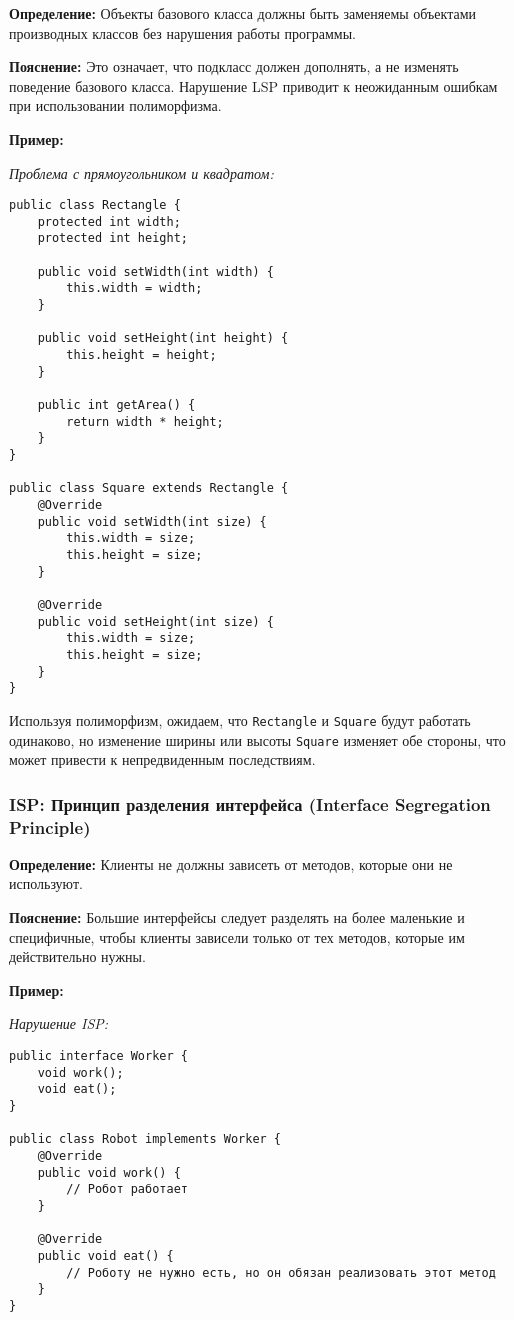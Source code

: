 \textbf{Определение:}
Объекты базового класса должны быть заменяемы объектами производных классов без нарушения работы программы.

\textbf{Пояснение:}
Это означает, что подкласс должен дополнять, а не изменять поведение базового класса. Нарушение LSP приводит к неожиданным ошибкам при использовании полиморфизма.

\textbf{Пример:}

\textit{Проблема с прямоугольником и квадратом:}
\begin{verbatim}
public class Rectangle {
    protected int width;
    protected int height;

    public void setWidth(int width) {
        this.width = width;
    }

    public void setHeight(int height) {
        this.height = height;
    }

    public int getArea() {
        return width * height;
    }
}

public class Square extends Rectangle {
    @Override
    public void setWidth(int size) {
        this.width = size;
        this.height = size;
    }

    @Override
    public void setHeight(int size) {
        this.width = size;
        this.height = size;
    }
}
\end{verbatim}

Используя полиморфизм, ожидаем, что \texttt{Rectangle} и \texttt{Square} будут работать одинаково, но изменение ширины или высоты \texttt{Square} изменяет обе стороны, что может привести к непредвиденным последствиям.

\subsubsection{ISP: Принцип разделения интерфейса (Interface Segregation Principle)}

\textbf{Определение:}
Клиенты не должны зависеть от методов, которые они не используют.

\textbf{Пояснение:}
Большие интерфейсы следует разделять на более маленькие и специфичные, чтобы клиенты зависели только от тех методов, которые им действительно нужны.

\textbf{Пример:}

\textit{Нарушение ISP:}
\begin{verbatim}
public interface Worker {
    void work();
    void eat();
}

public class Robot implements Worker {
    @Override
    public void work() {
        // Робот работает
    }

    @Override
    public void eat() {
        // Роботу не нужно есть, но он обязан реализовать этот метод
    }
}
\end{verbatim}

